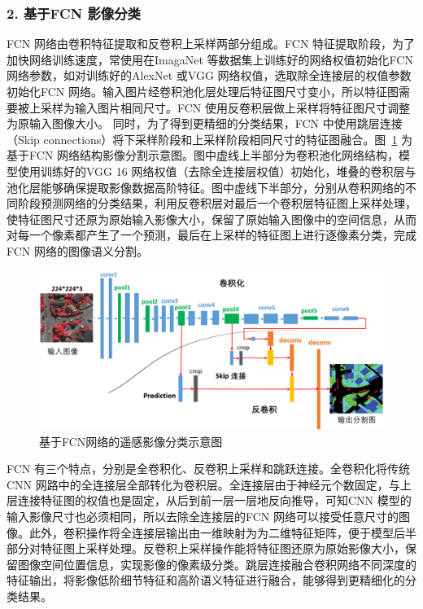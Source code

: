 \subsubsection*{2. 基于FCN 影像分类}
\label{subsec:chap02-2-2-2}
FCN 网络由卷积特征提取和反卷积上采样两部分组成。FCN 特征提取阶段，为了加快网络训练速度，常使用在ImagaNet 等数据集上训练好的网络权值初始化FCN 网络参数，如对训练好的AlexNet\cite{krizhevsky2012imagenet} 或VGG\cite{simonyan2014very} 网络权值，选取除全连接层的权值参数初始化FCN 网络。输入图片经卷积池化层处理后特征图尺寸变小，所以特征图需要被上采样为输入图片相同尺寸。FCN 使用反卷积层做上采样将特征图尺寸调整为原输入图像大小。 同时，为了得到更精细的分类结果，FCN 中使用跳层连接（Skip connections）将下采样阶段和上采样阶段相同尺寸的特征图融合。图~\ref{fig:vgg-fcn} 为基于FCN 网络结构影像分割示意图。图中虚线上半部分为卷积池化网络结构，模型使用训练好的VGG 16 网络权值（去除全连接层权值）初始化，堆叠的卷积层与池化层能够确保提取影像数据高阶特征。图中虚线下半部分，分别从卷积网络的不同阶段预测网络的分类结果，利用反卷积层对最后一个卷积层特征图上采样处理，使特征图尺寸还原为原始输入影像大小，保留了原始输入图像中的空间信息，从而对每一个像素都产生了一个预测，最后在上采样的特征图上进行逐像素分类，完成FCN 网络的图像语义分割。

\begin{figure}[htb]
  \centering
  \includegraphics[width=1.0\textwidth]{figures/vgg-fcn}
  \caption{基于FCN网络的遥感影像分类示意图}\label{fig:vgg-fcn}
\end{figure}

FCN 有三个特点，分别是全卷积化、反卷积上采样和跳跃连接。全卷积化将传统CNN 网路中的全连接层全部转化为卷积层。全连接层由于神经元个数固定，与上层连接特征图的权值也是固定，从后到前一层一层地反向推导，可知CNN 模型的输入影像尺寸也必须相同，所以去除全连接层的FCN 网络可以接受任意尺寸的图像。此外，卷积操作将全连接层输出由一维映射为为二维特征矩阵，便于模型后半部分对特征图上采样处理。反卷积上采样操作能将特征图还原为原始影像大小，保留图像空间位置信息，实现影像的像素级分类。跳层连接融合卷积网络不同深度的特征输出，将影像低阶细节特征和高阶语义特征进行融合，能够得到更精细化的分类结果。


